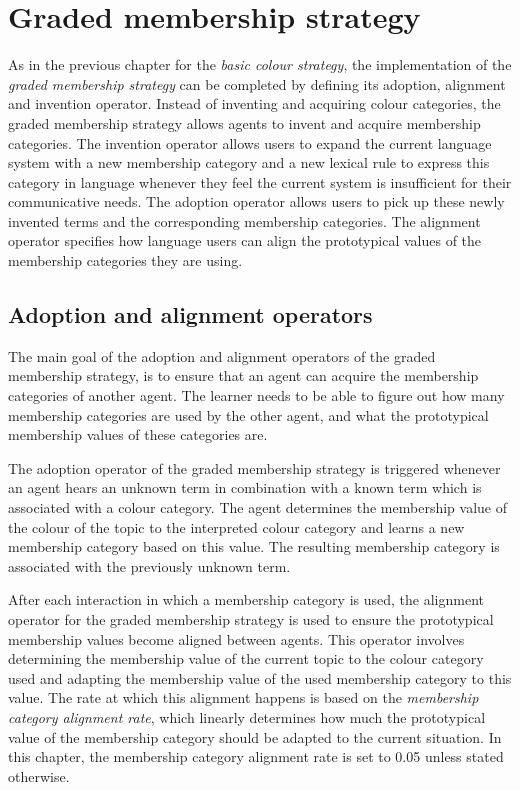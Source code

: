 \chapter{Graded membership strategy}
\label{s:graded-operators}

As in the previous chapter for the \emph{basic colour strategy}, the
implementation of the \emph{graded membership strategy} can be
completed by defining its adoption, alignment and invention
operator. Instead of inventing and acquiring colour categories, the
graded membership strategy allows agents to invent and acquire
membership categories. The invention operator allows users to expand
the current language system with a new membership category and a new
lexical rule to express this category in language whenever they feel
the current system is insufficient for their communicative needs. The
adoption operator allows users to pick up these newly invented terms
and the corresponding membership categories. The alignment operator
specifies how language users can align the prototypical values of the
membership categories they are using.

\section{Adoption and alignment operators}

The main goal of the adoption and alignment operators of the graded
membership strategy, is to ensure that an agent can acquire the
membership categories of another agent. The learner needs to be able
to figure out how many membership categories are used by the other
agent, and what the prototypical membership values of these categories
are.

The adoption operator 
of the graded membership strategy is triggered
whenever an agent hears an unknown term in combination with a known
term which is associated with a colour category. The agent determines
the membership value of the colour of the topic to the interpreted colour
category and learns a new membership category based on this 
value. The resulting membership category is associated with the
previously unknown term.

After each interaction in which a membership category is used, the
alignment operator
for the graded membership strategy is
used to ensure the prototypical membership values become aligned between agents. This
operator involves determining the membership value of the current
topic to the colour category used and adapting the membership value of the
used membership category to this value. The rate at which this
alignment happens is based on the \emph{membership category alignment rate},
which linearly
determines how much the prototypical value of the membership category
should be adapted to the current situation. In this chapter, the membership category
alignment rate is set to 0.05 unless stated otherwise.

